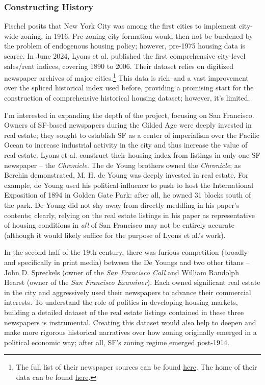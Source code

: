 \documentclass{article}[11pt]
\begin{document}
		\subsubsection{Constructing History}
Fischel posits that New York City was among the first cities to implement city-wide zoning, in 1916. \citep{fischel2004economic} Pre-zoning city formation would then not be burdened by the problem of endogenous housing policy; however, pre-1975 housing data is scarce. In June 2024, Lyons et al. published the first comprehensive city-level sales/rent indices, covering 1890 to 2006. \citep{lyons2024price} Their dataset relies on digitized newspaper archives of major cities.\footnote{The full list of their newspaper sources can be found \href{https://www.philadelphiafed.org/surveys-and-data/data-sources}{here}. The home of their data can be found \href{https://www.philadelphiafed.org/surveys-and-data/regional-economic-analysis/historical-housing-prices}{here}.} This data is rich--and a vast improvement over the spliced historical index used before, providing a promising start for the construction of comprehensive historical housing dataset; however, it's limited. 

I'm interested in expanding the depth of the project, focusing on San Francisco. Owners of SF-based newspapers during the Gilded Age were deeply invested in real estate; they sought to establish SF as a center of imperialism over the Pacific Ocean to increase industrial activity in the city and thus increase the value of real estate. \citep{brechin2006imperial} Lyons et al. construct their housing index from listings in only one SF newspaper -- the \textit{Chronicle}. The de Young brothers owned the \textit{Chronicle}; as Berchin demonstrated, M. H. de Young was deeply invested in real estate. For example, de Young used his political influence to push to host the International Exposition of 1894 in Golden Gate Park: after all, he owned 31 blocks south of the park. De Young did not shy away from directly meddling in his paper's contents; clearly, relying on the real estate listings in his paper as representative of housing conditions in \textit{all} of San Francisco may not be entirely accurate (although it would likely suffice for the purpose of Lyons et al.'s work).

In the second half of the 19th century, there was furious competition (broadly and specifically in print media) between the De Youngs and two other titans -- John D. Spreckels (owner of the \textit{San Francisco Call} and William Randolph Hearst (owner of the \textit{San Francisco Examiner}). Each owned significant real estate in the city and aggressively used their newspapers to advance their commercial interests. To understand the role of politics in developing housing markets, building a detailed dataset of the real estate listings contained in these three newspapers is instrumental. Creating this dataset would also help to deepen and make more rigorous historical narratives over how zoning originally emerged in a political economic way; after all, SF's zoning regime emerged post-1914. \citep{weiss1988real}
\end{document}
